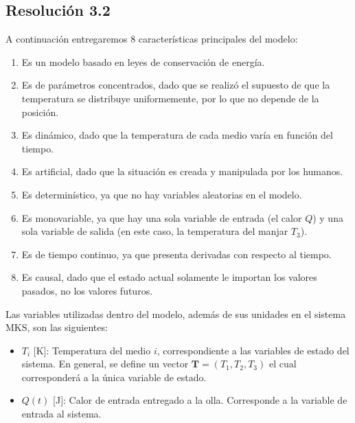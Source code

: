 \documentclass[
  11pt,
  letterpaper,
   addpoints,
   answers
  ]{exam}
\begin{document}
\begin{questions}
\begin{solution}
\subsection*{Resolución 3.2}
A continuación entregaremos 8 características principales del modelo:
\begin{enumerate}
    \item Es un modelo basado en leyes de conservación de energía.
    \item Es de parámetros concentrados, dado que se realizó el supuesto de que la temperatura se distribuye uniformemente, por lo que no depende de la posición.
    \item Es dinámico, dado que la temperatura de cada medio varía en función del tiempo.
    \item Es artificial, dado que la situación es creada y manipulada por los humanos.
    \item Es determinístico, ya que no hay variables aleatorias en el modelo.
    \item Es monovariable, ya que hay una sola variable de entrada (el calor $Q$) y una sola variable de salida (en este caso, la temperatura del manjar $T_3$).
    \item Es de tiempo continuo, ya que presenta derivadas con respecto al tiempo.
    \item Es causal, dado que el estado actual solamente le importan los valores pasados, no los valores futuros.
\end{enumerate}

Las variables utilizadas dentro del modelo, además de sus unidades en el sistema MKS, son las siguientes:

\begin{itemize}
    \item $T_i$ [K]: Temperatura del medio $i$, correspondiente a las variables de estado del sistema. En general, se define un vector $\mathbf{T} = (T_1, T_2, T_3)$ el cual corresponderá a la única variable de estado.
    \item $Q(t)$ [J]: Calor de entrada entregado a la olla. Corresponde a la variable de entrada al sistema.
\end{itemize}


\end{solution}
\end{questions}
\end{document}
